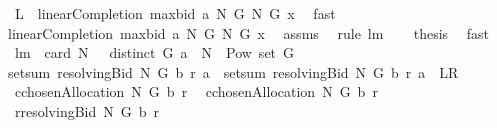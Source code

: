\begin{isabellebody}
\ {\isachardoublequoteopen}{\isacharquery}L\ {\isacharequal}\ linearCompletion{\isacharprime}\ {\isacharparenleft}maxbid{\isacharprime}\ a\ N\ G{\isacharparenright}\ N\ G\ x{\isachardoublequoteclose}\ \isamarkupfalse%
\ fast\ \isamarkupfalse%
\ \isamarkupfalse%
\ {\isachardoublequoteopen}{\isachardot}{\isachardot}{\isachardot}{\isacharequal}\ \isanewline
linearCompletion\ {\isacharparenleft}maxbid\ a\ N\ G{\isacharparenright}\ N\ G\ x{\isachardoublequoteclose}\ \isamarkupfalse%
\ assms\ \isamarkupfalse%
\ {\isacharparenleft}rule\ lm{}{}{\isacharparenright}\ \isamarkupfalse%
\ \isamarkupfalse%
\ {\isacharquery}thesis\ \isamarkupfalse%
\ fast\isanewline
{}\isamarkupfalse%
%
\endisatagproof
{\isafoldproof}%
%
\isadelimproof
\ \isanewline
%
\endisadelimproof
\isanewline
{}\isamarkupfalse%
\ lm{}{}{\isacharcolon}\ \ {\isachardoublequoteopen}card\ N\ {\isachargreater}\ {}{\isachardoublequoteclose}\ {\isachardoublequoteopen}distinct\ G{\isachardoublequoteclose}\ {\isachardoublequoteopen}a\ {\isasymsubseteq}\ {\isacharparenleft}N\ {\isasymtimes}\ {\isacharparenleft}Pow\ {\isacharparenleft}set\ G{\isacharparenright}\ {\isacharminus}\ {\isacharbraceleft}{\isacharbraceleft}{\isacharbraceright}{\isacharbraceright}{\isacharparenright}{\isacharparenright}{\isachardoublequoteclose}\ \isanewline
{\isachardoublequoteopen}setsum\ {\isacharparenleft}resolvingBid{\isacharprime}\ N\ G\ b\ r{\isacharparenright}\ a\ {\isacharequal}\ setsum\ {\isacharparenleft}resolvingBid\ N\ G\ b\ r{\isacharparenright}\ a{\isachardoublequoteclose}\ {\isacharparenleft}\ {\isachardoublequoteopen}{\isacharquery}L{\isacharequal}{\isacharquery}R{\isachardoublequoteclose}{\isacharparenright}\ \isanewline
%
\isadelimproof
\isanewline
%
\endisadelimproof
%
\isatagproof
{}\isamarkupfalse%
\ {\isacharminus}\ \isanewline
{}\isamarkupfalse%
\ {\isacharquery}c{\isacharprime}{\isacharequal}{\isachardoublequoteopen}chosenAllocation{\isacharprime}\ N\ G\ b\ r{\isachardoublequoteclose}\ \isamarkupfalse%
\ {\isacharquery}c{\isacharequal}{\isachardoublequoteopen}chosenAllocation\ N\ G\ b\ r{\isachardoublequoteclose}\ \isamarkupfalse%
\ {\isacharquery}r{\isacharprime}{\isacharequal}{\isachardoublequoteopen}resolvingBid{\isacharprime}\ N\ G\ b\ r{\isachardoublequoteclose}\isanewline

\end{isabellebody}

